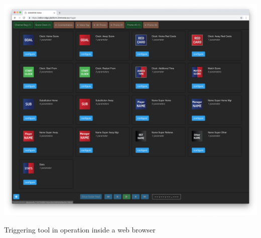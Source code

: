 \documentclass[sigchi-a, authorversion]{acmart}
\begin{document}
\begin{marginfigure}
    \vspace{-6.5cm}
    \includegraphics[width=\marginparwidth-10pt]{Figures/triggertool.jpg}
    \caption{Triggering tool in operation inside a web browser}
    \label{fig:triggertool}
\end{marginfigure}
\end{document}
